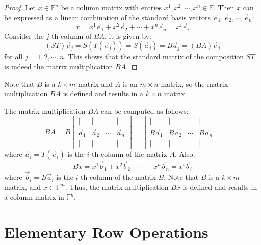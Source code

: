 \documentclass[
	11pt, %
	fleqn, %
	a4paper, %
]{LegrandOrangeBook}
\newcommand{\F}{\mathbb{F}} %
\begin{document}
\begin{proof}
    Let $x \in \F^n$ be a column matrix with entries $x^1, x^2, \cdots, x^n \in \F$. Then $x$ can be expressed as a linear combination of the standard basis vectors $\vec{e}_1, \vec{e}_2, \cdots, \vec{e}_n$:
    \[
        x = x^1 \vec{e}_1 + x^2 \vec{e}_2 + \cdots + x^n \vec{e}_n = x^i \vec{e}_i
    \]
    Consider the $j$-th column of $BA$, it is given by:
    \[
        (ST)\vec{e}_j = S(T(\vec{e}_j)) = S(\vec{a}_j) = B\vec{a}_j = (BA)\vec{e}_j
    \]
    for all $j = 1, 2, \cdots, n$. This shows that the standard matrix of the composition $ST$ is indeed the matrix multiplication $BA$.
\end{proof}
\begin{remark}
    Note that $B$ is a $k \times m$ matrix and $A$ is an $m \times n$ matrix, so the matrix multiplication $BA$ is defined and results in a $k \times n$ matrix.
\end{remark}

The matrix multiplication $BA$ can be computed as follows:
\[
    BA = B\begin{bmatrix}
        | & | & & | \\
        \vec{a}_1 & \vec{a}_2 & \cdots & \vec{a}_n \\
        | & | & & |
    \end{bmatrix} = \begin{bmatrix}
        | & | & & | \\
        B\vec{a}_1 & B\vec{a}_2 & \cdots & B\vec{a}_n \\
        | & | & & |
    \end{bmatrix}
\]
where $\vec{a}_i = T(\vec{e}_i)$ is the $i$-th column of the matrix $A$. Also, 
\[
    Bx = x^1 \vec{b}_1 + x^2 \vec{b}_2 + \cdots + x^n \vec{b}_n = x^i \vec{b}_i
\]
where $\vec{b}_i = B\vec{a}_i$ is the $i$-th column of the matrix $B$. Note that $B$ is a $k \times m$ matrix, and $x \in \F^m$. Thus, the matrix multiplication $Bx$ is defined and results in a column matrix in $\F^k$.

\newpage

\section{Elementary Row Operations}
\end{document}
